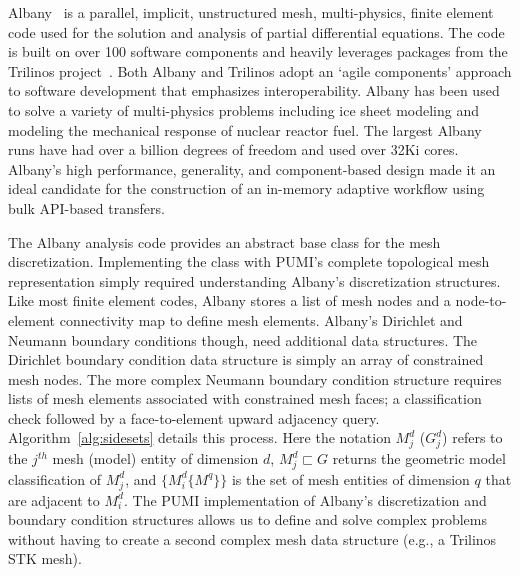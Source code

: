Albany~\cite{salinger2013albany,albany2016} is a parallel, implicit,
unstructured mesh, multi-physics, finite element code used for the solution and analysis of partial
differential equations.
The code is built on over 100 software components and heavily leverages packages
from the Trilinos project~\cite{TrilinosOverview}.
Both Albany and Trilinos adopt an `agile components' approach
to software development that emphasizes interoperability.
Albany has been used to solve a variety of multi-physics problems
including ice sheet modeling and modeling the mechanical response of nuclear
reactor fuel.
The largest Albany runs have had over a billion degrees of freedom and
used over 32Ki cores.
Albany's high performance, generality, and component-based design made it an
ideal candidate for the construction of an in-memory adaptive workflow using
bulk API-based transfers.

The Albany analysis code provides an abstract base class for the mesh
discretization.
Implementing the class with PUMI's complete topological mesh representation
simply required understanding Albany's discretization structures.
Like most finite element codes, Albany stores a list of mesh
nodes and a node-to-element connectivity map to define mesh elements.
Albany's Dirichlet and Neumann boundary conditions though, need additional data
structures.
The Dirichlet boundary condition data structure is simply an array of
constrained mesh nodes.
The more complex Neumann boundary condition structure requires lists of mesh
elements associated with constrained mesh faces; a classification check followed
by a face-to-element upward adjacency query.
Algorithm~\ref{alg:sidesets} details this process.
Here the notation $M^d_j$ ($G^d_j$) refers to the $j^{th}$ mesh (model)
entity of dimension $d$,
$M^d_j \sqsubset G$ returns the geometric model classification of $M^d_j$, and
$\{M^d_i\{M^q\}\}$ is the set of mesh entities of dimension $q$ that are
adjacent to $M^d_i$.
The PUMI implementation of Albany's discretization and boundary
condition structures allows us to define and solve complex problems without
having to create a second complex mesh data structure (e.g., a Trilinos STK
mesh).

